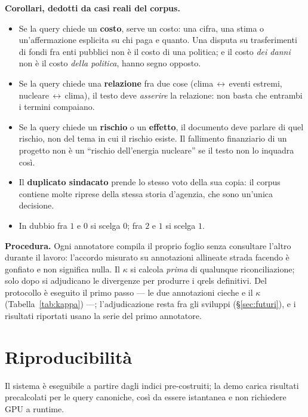 \documentclass[11pt,a4paper]{report}
\begin{document}
\noindent\textbf{Corollari, dedotti da casi reali del corpus.}
\begin{itemize}[leftmargin=*]
  \item Se la query chiede un \textbf{costo}, serve un costo: una cifra, una stima o
        un'affermazione esplicita su chi paga e quanto. Una disputa su trasferimenti di fondi fra
        enti pubblici non è il costo di una politica; e il costo \emph{dei danni} non è il costo
        \emph{della politica}, hanno segno opposto.
  \item Se la query chiede una \textbf{relazione} fra due cose
        (clima\,$\leftrightarrow$\,eventi estremi, nucleare\,$\leftrightarrow$\,clima), il testo
        deve \emph{asserire} la relazione: non basta che entrambi i termini compaiano.
  \item Se la query chiede un \textbf{rischio} o un \textbf{effetto}, il documento deve parlare di
        quel rischio, non del tema in cui il rischio esiste. Il fallimento finanziario di un
        progetto non è un ``rischio dell'energia nucleare'' se il testo non lo inquadra così.
  \item Il \textbf{duplicato sindacato} prende lo stesso voto della sua copia: il corpus contiene
        molte riprese della stessa storia d'agenzia, che sono un'unica decisione.
  \item In dubbio fra $1$ e $0$ si scelga $0$; fra $2$ e $1$ si scelga $1$.
\end{itemize}

\noindent\textbf{Procedura.} Ogni annotatore compila il proprio foglio senza consultare l'altro
durante il lavoro: l'accordo misurato su annotazioni allineate strada facendo è gonfiato e non
significa nulla. Il $\kappa$ si calcola \emph{prima} di qualunque riconciliazione; solo dopo si
adjudicano le divergenze per produrre i qrels definitivi. Del protocollo è eseguito il primo passo
--- le due annotazioni cieche e il $\kappa$ (Tabella~\ref{tab:kappa}) ---; l'adjudicazione resta fra
gli sviluppi (\S\ref{sec:futuri}), e i risultati riportati usano la serie del primo annotatore.

\chapter{Riproducibilità}\label{app:comandi}
Il sistema è eseguibile a partire dagli indici pre-costruiti; la demo carica risultati precalcolati
per le query canoniche, così da essere istantanea e non richiedere GPU a runtime.
\end{document}
